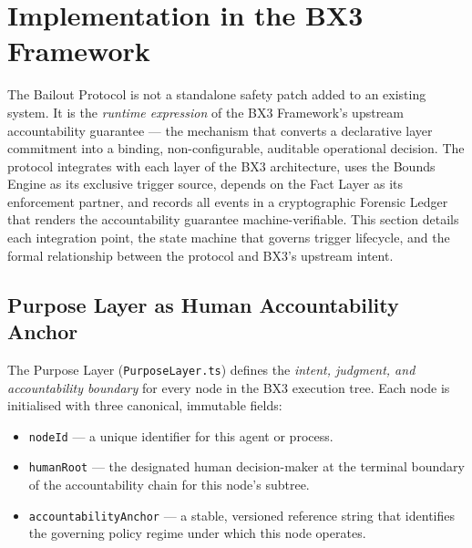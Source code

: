 
\section{Implementation in the BX3 Framework}
\label{sec:bailout-implementation}

The Bailout Protocol is not a standalone safety patch added to an existing system.
It is the \emph{runtime expression} of the BX3 Framework's upstream accountability
guarantee — the mechanism that converts a declarative layer commitment into a
binding, non-configurable, auditable operational decision.  The protocol integrates
with each layer of the BX3 architecture, uses the Bounds Engine as its exclusive
trigger source, depends on the Fact Layer as its enforcement partner, and records all
events in a cryptographic Forensic Ledger that renders the accountability guarantee
machine-verifiable.  This section details each integration point, the state machine
that governs trigger lifecycle, and the formal relationship between the protocol and
BX3's upstream intent.

\subsection{Purpose Layer as Human Accountability Anchor}

The Purpose Layer (\texttt{PurposeLayer.ts}) defines the \emph{intent, judgment, and
accountability boundary} for every node in the BX3 execution tree.  Each node is
initialised with three canonical, immutable fields:

\begin{itemize}
  \item \texttt{nodeId} — a unique identifier for this agent or process.
  \item \texttt{humanRoot} — the designated human decision-maker at the terminal
        boundary of the accountability chain for this node's subtree.
  \item \texttt{accountabilityAnchor} — a stable, versioned reference string that
        identifies the governing policy regime under which this node operates.
\end{itemize}

